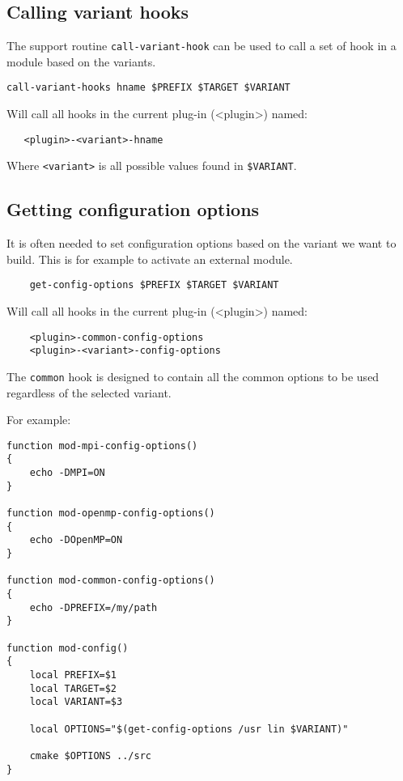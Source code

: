 \documentclass[a4paper,12pt,twoside]{article}
\newcommand{\code}[1]{\texttt{#1}}
\begin{document}
\subsection{Calling variant hooks}
\label{call variant hooks}

The support routine \code{call-variant-hook} can be used to call a set of hook in a module based on the variants.

\begin{lstlisting}
call-variant-hooks hname $PREFIX $TARGET $VARIANT
\end{lstlisting}

Will call all hooks in the current plug-in (<plugin>) named:

\begin{lstlisting}
   <plugin>-<variant>-hname
\end{lstlisting}

Where \code{<variant>} is all possible values found in \code{\$VARIANT}.

\subsection{Getting configuration options}
\label{get config options}

It is often needed to set configuration options based on the variant we want to build. This is for example to activate an external module.

\begin{lstlisting}
	get-config-options $PREFIX $TARGET $VARIANT
\end{lstlisting}

Will call all hooks in the current plug-in (<plugin>) named:

\begin{lstlisting}
	<plugin>-common-config-options
	<plugin>-<variant>-config-options
\end{lstlisting}

The \code{common} hook is designed to contain all the common options to be used regardless of the selected variant.

For example:

\begin{lstlisting}
function mod-mpi-config-options()
{
	echo -DMPI=ON
}

function mod-openmp-config-options()
{
	echo -DOpenMP=ON
}

function mod-common-config-options()
{
	echo -DPREFIX=/my/path
}

function mod-config()
{
	local PREFIX=$1
	local TARGET=$2
	local VARIANT=$3

	local OPTIONS="$(get-config-options /usr lin $VARIANT)"

	cmake $OPTIONS ../src
}
\end{lstlisting}
\end{document}
